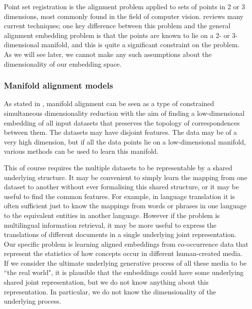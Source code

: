 Point set registration is the alignment problem applied to sets of points in 2 or 3 dimensions, most commonly found in the field of computer vision. \cite{PointSetRegistrationReview} reviews many current techniques; one key difference between this problem and the general alignment embedding problem is that the points are known to lie on a 2- or 3-dimensional manifold, and this is quite a significant constraint on the problem. As we will see later, we cannot make any such assumptions about the dimensionality of our embedding space. 

\subsubsection{Manifold alignment models}

As stated in \cite{ManifoldLearningTheoryAndApplications}, manifold alignment can be seen as a type of constrained simultaneous dimensionality reduction with the aim of finding a low-dimensional embedding of all input datasets that preserves the topology of correspondences between them. The datasets may have disjoint features. The data may be of a very high dimension, but if all the data points lie on a low-dimensional manifold, various methods can be used to learn this manifold.  

This of course requires the multiple datasets to be representable by a shared underlying structure. It may be convenient to simply learn the mapping from one dataset to another without ever formalising this shared structure, or it may be useful to find the common features. For example, in language translation it is often sufficient just to know the mappings from words or phrases in one language to the equivalent entities in another language. However if the problem is multilingual information retrieval, it may be more useful to express the translations of different documents in a single underlying joint representation. Our specific problem is learning aligned embeddings from co-occurrence data that represent the statistics of how concepts occur in different human-created media. If we consider the ultimate underlying generative process of all these media to be ``the real world", it is plausible that the embeddings could have some underlying shared joint representation, but we do not know anything about this representation. In particular, we do not know the dimensionality of the underlying process. 

